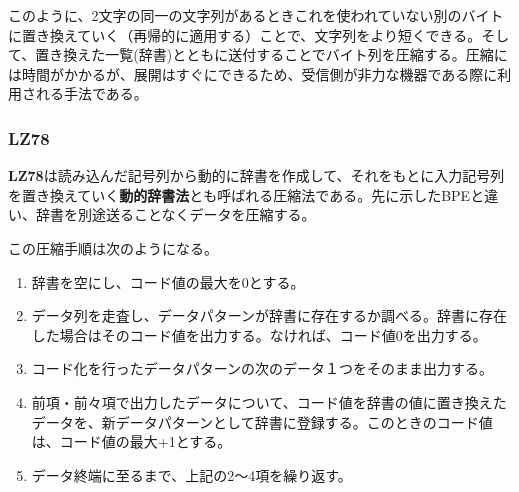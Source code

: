 このように、2文字の同一の文字列があるときこれを使われていない別のバイトに置き換えていく（再帰的に適用する）ことで、文字列をより短くできる。そして、置き換えた一覧(辞書)とともに送付することでバイト列を圧縮する。圧縮には時間がかかるが、展開はすぐにできるため、受信側が非力な機器である際に利用される手法である。

\subsubsection{LZ78}
\textbf{LZ78}は読み込んだ記号列から動的に辞書を作成して、それをもとに入力記号列を置き換えていく\textbf{動的辞書法}とも呼ばれる圧縮法である。先に示したBPEと違い、辞書を別途送ることなくデータを圧縮する。

この圧縮手順は次のようになる。
\begin{enumerate}
\item 辞書を空にし、コード値の最大を0とする。
\item データ列を走査し、データパターンが辞書に存在するか調べる。辞書に存在した場合はそのコード値を出力する。なければ、コード値0を出力する。
\item コード化を行ったデータパターンの次のデータ１つをそのまま出力する。
\item 前項・前々項で出力したデータについて、コード値を辞書の値に置き換えたデータを、新データパターンとして辞書に登録する。このときのコード値は、コード値の最大+1とする。
\item データ終端に至るまで、上記の2～4項を繰り返す。
\end{enumerate}

